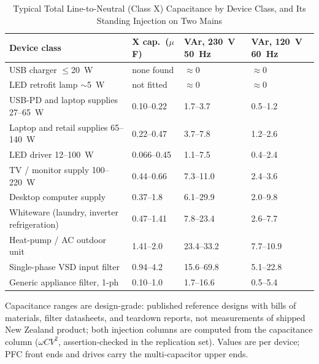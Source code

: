 \documentclass[journal]{IEEEtran}
\begin{document}
\begin{table}[!t]
\caption{Typical Total Line-to-Neutral (Class X) Capacitance by Device Class,
and Its Standing Injection on Two Mains}
\label{tab:xcapclasses}
\centering
\renewcommand{\arraystretch}{1.18}
\begin{tabular}{@{}p{}p{}p{}p{}@{}}
\toprule
\textbf{Device class} & \textbf{X cap.\ ($\mu$F)} & \textbf{VAr, 230~V 50~Hz} & \textbf{VAr, 120~V 60~Hz} \\
\midrule
USB charger $\le$20~W & none found & $\approx$0 & $\approx$0 \\
LED retrofit lamp $\sim$5~W & not fitted & $\approx$0 & $\approx$0 \\
USB-PD and laptop supplies 27--65~W & 0.10--0.22 & 1.7--3.7 & 0.5--1.2 \\
Laptop and retail supplies 65--140~W & 0.22--0.47 & 3.7--7.8 & 1.2--2.6 \\
LED driver 12--100~W & 0.066--0.45 & 1.1--7.5 & 0.4--2.4 \\
TV / monitor supply 100--220~W & 0.44--0.66 & 7.3--11.0 & 2.4--3.6 \\
Desktop computer supply & 0.37--1.8 & 6.1--29.9 & 2.0--9.8 \\
Whiteware (laundry, inverter refrigeration) & 0.47--1.41 & 7.8--23.4 & 2.6--7.7 \\
Heat-pump / AC outdoor unit & 1.41--2.0 & 23.4--33.2 & 7.7--10.9 \\
Single-phase VSD input filter & 0.94--4.2 & 15.6--69.8 & 5.1--22.8 \\
Generic appliance filter, 1-ph & 0.10--1.0 & 1.7--16.6 & 0.5--5.4 \\
\bottomrule
\end{tabular}
\vspace{2pt}
\begin{flushleft}
\footnotesize Capacitance ranges are design-grade: published reference
designs with bills of materials, filter datasheets, and teardown reports,
not measurements of shipped New Zealand product; both injection columns are
computed from the capacitance column ($\omega C V^2$, assertion-checked in
the replication set). Values are per device; PFC front ends and drives carry
the multi-capacitor upper ends.
\end{flushleft}
\end{table}
\end{document}
